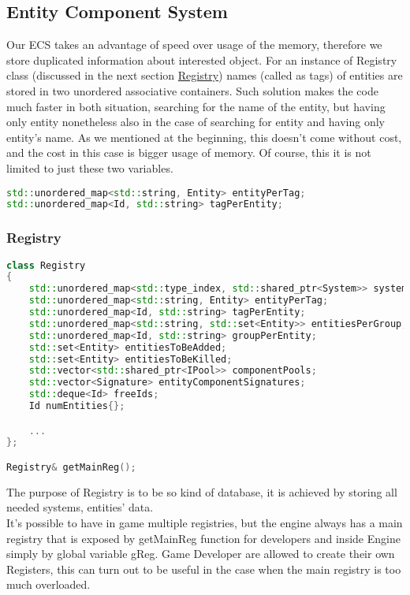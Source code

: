 \subsection{Entity Component System}
Our ECS takes an advantage of speed over usage of the memory, therefore we store duplicated information about interested object. For an instance of Registry class (discussed in the next section \hyperref[sec:registry]{Registry}) names (called as tags) of entities are stored in two unordered associative containers. Such solution makes the code much faster in both situation, searching for the name of the entity, but having only entity nonetheless also in the case of searching for entity and having only entity's name.
As we mentioned at the beginning, this doesn't come without cost, and the cost in this case is bigger usage of memory.
Of course, this it is not limited to just these two variables.

\begin{lstlisting}[language=c++, caption=Entities' name (./engine/include/tsengine/ecs/ecs.h)]
std::unordered_map<std::string, Entity> entityPerTag;
std::unordered_map<Id, std::string> tagPerEntity;
\end{lstlisting}

\newpage

\subsubsection{Registry}
 \label{sec:registry}
\begin{lstlisting}[language=c++, caption=Registry class]
class Registry
{
    std::unordered_map<std::type_index, std::shared_ptr<System>> systems;
    std::unordered_map<std::string, Entity> entityPerTag;
    std::unordered_map<Id, std::string> tagPerEntity;
    std::unordered_map<std::string, std::set<Entity>> entitiesPerGroup;
    std::unordered_map<Id, std::string> groupPerEntity;
    std::set<Entity> entitiesToBeAdded;
    std::set<Entity> entitiesToBeKilled;
    std::vector<std::shared_ptr<IPool>> componentPools;
    std::vector<Signature> entityComponentSignatures;
    std::deque<Id> freeIds;
    Id numEntities{};

    ...
};

Registry& getMainReg();
\end{lstlisting}
The purpose of Registry is to be so kind of database, it is achieved by storing all needed systems, entities' data.\\
It's possible to have in game multiple registries, but the engine always has a main registry that is exposed by getMainReg function for developers and inside Engine simply by global variable gReg.
Game Developer are allowed to create their own Registers, this can turn out to be useful in the case when the main registry is too much overloaded.

